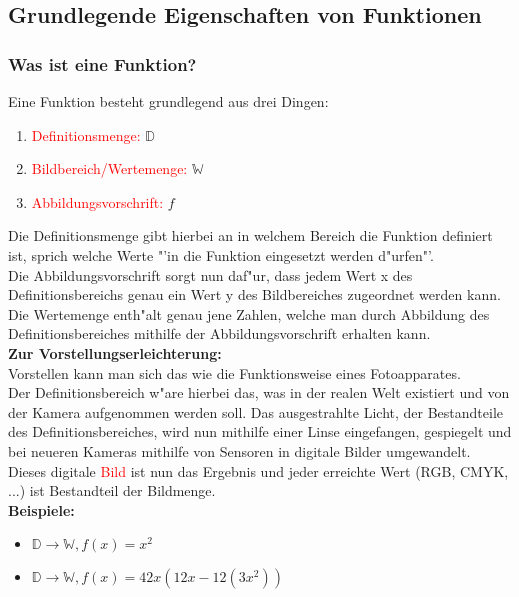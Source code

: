 \subsection{Grundlegende Eigenschaften von Funktionen}
\subsubsection{Was ist eine Funktion?}
Eine Funktion besteht grundlegend aus drei Dingen:
\begin{enumerate}
\item\textcolor{red}{Definitionsmenge:} $\mathbb{D}$
\item\textcolor{red}{Bildbereich/Wertemenge:} $\mathbb{W}$
\item\textcolor{red}{Abbildungsvorschrift:} $f$
\end{enumerate}
\begin{flushleft}
Die Definitionsmenge gibt hierbei an in welchem Bereich die Funktion definiert ist, sprich welche Werte "'in die Funktion eingesetzt werden d"urfen"'.\\\vspace{0.5 cm}
Die Abbildungsvorschrift sorgt nun daf"ur, dass jedem Wert x des Definitionsbereichs genau ein Wert y des Bildbereiches zugeordnet werden kann.\\\vspace{0.5 cm}
Die Wertemenge enth"alt genau jene Zahlen, welche man durch Abbildung des Definitionsbereiches mithilfe der Abbildungsvorschrift erhalten kann.\\\vspace{0.5 cm}
\textbf{Zur Vorstellungserleichterung:}\\
Vorstellen kann man sich das wie die Funktionsweise eines Fotoapparates.\\
Der Definitionsbereich w"are hierbei das, was in der realen Welt existiert und von der Kamera aufgenommen werden soll.
Das ausgestrahlte Licht, der Bestandteile des Definitionsbereiches, wird nun mithilfe einer Linse eingefangen, gespiegelt und bei neueren Kameras mithilfe von Sensoren in digitale Bilder umgewandelt. Dieses digitale \textcolor{red}{Bild} ist nun das Ergebnis und jeder erreichte Wert (RGB, CMYK, ...) ist Bestandteil der Bildmenge.\\\vspace{0.5 cm}
\textbf{Beispiele:}\\
\begin{itemize}
\item $\mathbb{D}\rightarrow\mathbb{W}, f(x)=x^2$
\item $\mathbb{D}\rightarrow\mathbb{W}, f(x)=42x(12x-12(3x^2))$
\end{itemize}
\end{flushleft}

